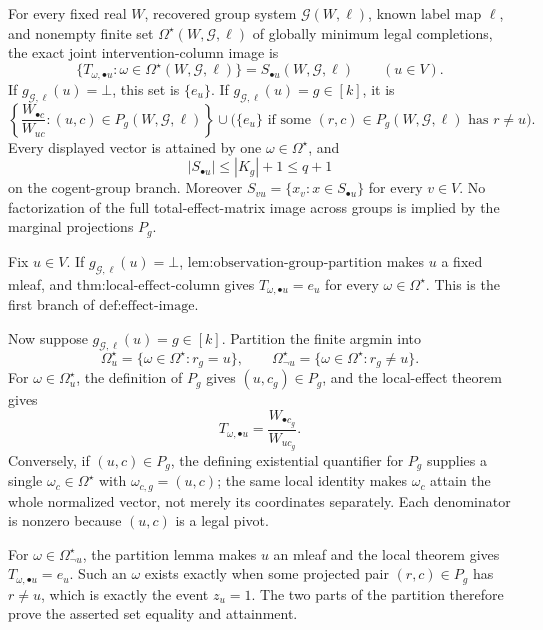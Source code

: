 For every fixed real \(W\), recovered group system \(\mathcal G(W,\ell)\), known label map \(\ell\), and nonempty finite set \(\Omega^{\star}(W,\mathcal G,\ell)\) of globally minimum legal completions, the exact joint intervention-column image is
\[
\{T_{\omega,\bullet u}:\omega\in\Omega^{\star}(W,\mathcal G,\ell)\}
=S_{\bullet u}(W,\mathcal G,\ell)
\qquad(u\in V).
\]
If \(g_{\mathcal G,\ell}(u)=\bot\), this set is \(\{e_u\}\).  If \(g_{\mathcal G,\ell}(u)=g\in[k]\), it is
\[
\left\{\frac{W_{\bullet c}}{W_{uc}}:(u,c)\in P_g(W,\mathcal G,\ell)\right\}
\cup
\bigl(\{e_u\}\text{ if some }(r,c)\in P_g(W,\mathcal G,\ell)\text{ has }r\ne u\bigr).
\]
Every displayed vector is attained by one \(\omega\in\Omega^{\star}\), and
\[
|S_{\bullet u}|\le |K_g|+1\le q+1
\]
on the cogent-group branch.  Moreover \(S_{vu}=\{x_v:x\in S_{\bullet u}\}\) for every \(v\in V\).  No factorization of the full total-effect-matrix image across groups is implied by the marginal projections \(P_g\).

Fix \(u\in V\).  If \(g_{\mathcal G,\ell}(u)=\bot\), \(\text{lem:observation-group-partition}\) makes \(u\) a fixed mleaf, and \(\text{thm:local-effect-column}\) gives \(T_{\omega,\bullet u}=e_u\) for every \(\omega\in\Omega^\star\).  This is the first branch of \(\text{def:effect-image}\).

Now suppose \(g_{\mathcal G,\ell}(u)=g\in[k]\).  Partition the finite argmin into
\[
\Omega_u^\star=\{\omega\in\Omega^\star:r_g=u\},
\qquad
\Omega_{\neg u}^\star=\{\omega\in\Omega^\star:r_g\ne u\}.
\]
For \(\omega\in\Omega_u^\star\), the definition of \(P_g\) gives \((u,c_g)\in P_g\), and the local-effect theorem gives
\[
T_{\omega,\bullet u}=\frac{W_{\bullet c_g}}{W_{uc_g}}.
\]
Conversely, if \((u,c)\in P_g\), the defining existential quantifier for \(P_g\) supplies a single \(\omega_c\in\Omega^\star\) with \(\omega_{c,g}=(u,c)\); the same local identity makes \(\omega_c\) attain the whole normalized vector, not merely its coordinates separately.  Each denominator is nonzero because \((u,c)\) is a legal pivot.

For \(\omega\in\Omega_{\neg u}^\star\), the partition lemma makes \(u\) an mleaf and the local theorem gives \(T_{\omega,\bullet u}=e_u\).  Such an \(\omega\) exists exactly when some projected pair \((r,c)\in P_g\) has \(r\ne u\), which is exactly the event \(z_u=1\).  The two parts of the partition therefore prove the asserted set equality and attainment.

